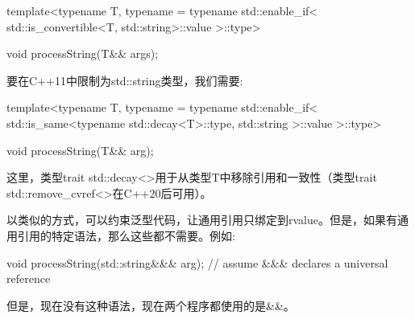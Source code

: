 \begin{cppcode}
template<typename T,
typename = typename std::enable_if<
std::is_convertible<T, std::string>::value
>::type>

void processString(T&& args);
\end{cppcode}

要在C++11中限制为std::string类型，我们需要:

\begin{cppcode}
template<typename T,
typename = typename std::enable_if<
std::is_same<typename std::decay<T>::type,
				std::string
			>::value
		>::type>

void processString(T&& arg);
\end{cppcode}

这里，类型trait std::decay<>用于从类型T中移除引用和一致性（类型trait std::remove_cvref<>在C++20后可用）。

以类似的方式，可以约束泛型代码，让通用引用只绑定到rvalue。但是，如果有通用引用的特定语法，那么这些都不需要。例如:

\begin{cppcode}
void processString(std::string&&& arg); // assume &&& declares a universal reference
\end{cppcode}

但是，现在没有这种语法，现在两个程序都使用的是\&\&。




























